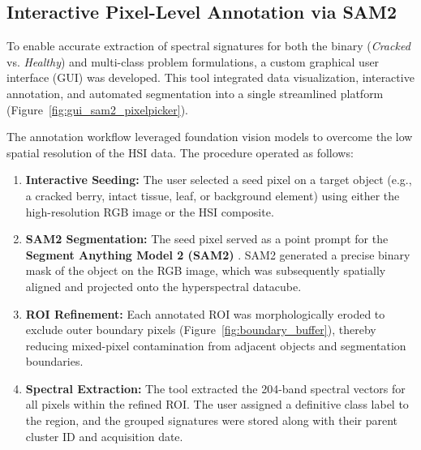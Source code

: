 \subsection{Interactive Pixel-Level Annotation via SAM2}
\label{subsec:dataset_pixel}

\noindent
To enable accurate extraction of spectral signatures for both the binary (\textit{Cracked} vs. \textit{Healthy}) and multi-class problem formulations, a custom graphical user interface (GUI) was developed. This tool integrated data visualization, interactive annotation, and automated segmentation into a single streamlined platform (Figure~\ref{fig:gui_sam2_pixelpicker}).

\medskip
\noindent
The annotation workflow leveraged foundation vision models to overcome the low spatial resolution of the HSI data. The procedure operated as follows:
\begin{enumerate}
    \item \textbf{Interactive Seeding:} The user selected a seed pixel on a target object (e.g., a cracked berry, intact tissue, leaf, or background element) using either the high-resolution RGB image or the HSI composite.
    \item \textbf{SAM2 Segmentation:} The seed pixel served as a point prompt for the \textbf{Segment Anything Model 2 (SAM2)} \parencite{ravi2024sam2}. SAM2 generated a precise binary mask of the object on the RGB image, which was subsequently spatially aligned and projected onto the hyperspectral datacube.
    \item \textbf{ROI Refinement:} Each annotated ROI was morphologically eroded to exclude outer boundary pixels (Figure~\ref{fig:boundary_buffer}), thereby reducing mixed-pixel contamination from adjacent objects and segmentation boundaries.
    \item \textbf{Spectral Extraction:} The tool extracted the 204-band spectral vectors for all pixels within the refined ROI. The user assigned a definitive class label to the region, and the grouped signatures were stored along with their parent cluster ID and acquisition date.
\end{enumerate}



